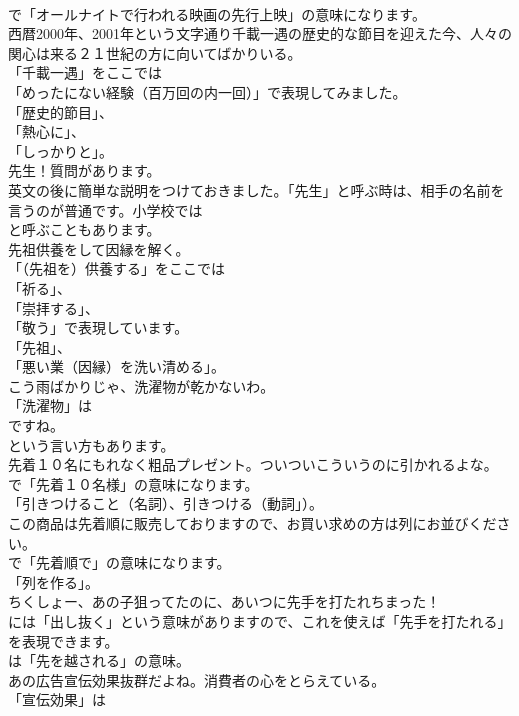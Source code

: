 \documentclass[8pt]{extreport}
\begin{document}
\begin{CJK}{UTF8}{min}
\\	で「オールナイトで行われる映画の先行上映」の意味になります。	
\\	西暦2000年、2001年という文字通り千載一遇の歴史的な節目を迎えた今、人々の関心は来る２１世紀の方に向いてばかりいる。 
\\	「千載一遇」をここでは
\\	「めったにない経験（百万回の内一回）」で表現してみました。
\\	「歴史的節目」、
\\	「熱心に」、
\\	「しっかりと」。	
\\	先生！質問があります。 
\\	英文の後に簡単な説明をつけておきました。「先生」と呼ぶ時は、相手の名前を言うのが普通です。小学校では
\\	と呼ぶこともあります。	
\\	先祖供養をして因縁を解く。 
\\	「（先祖を）供養する」をここでは
\\	「祈る」、
\\	「崇拝する」、
\\	「敬う」で表現しています。
\\	「先祖」、
\\	「悪い業（因縁）を洗い清める」。	
\\	こう雨ばかりじゃ、洗濯物が乾かないわ。 
\\	「洗濯物」は
\\	ですね。
\\	という言い方もあります。	
\\	先着１０名にもれなく粗品プレゼント。ついついこういうのに引かれるよな。 
\\	で「先着１０名様」の意味になります。
\\	「引きつけること（名詞）、引きつける（動詞」）。	
\\	この商品は先着順に販売しておりますので、お買い求めの方は列にお並びください。 
\\	で「先着順で」の意味になります。
\\	「列を作る」。	
\\	ちくしょー、あの子狙ってたのに、あいつに先手を打たれちまった！ 
\\	には「出し抜く」という意味がありますので、これを使えば「先手を打たれる」を表現できます。
\\	は「先を越される」の意味。	
\\	あの広告宣伝効果抜群だよね。消費者の心をとらえている。 
\\	「宣伝効果」は

\end{CJK}
\end{document}
